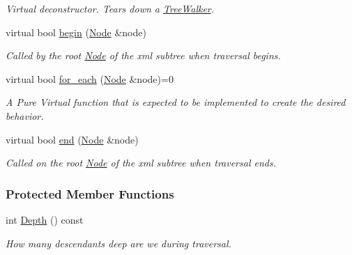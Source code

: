 \begin{DoxyCompactItemize}
\begin{DoxyCompactList}\small\item\em Virtual deconstructor. Tears down a \hyperlink{classphys_1_1xml_1_1TreeWalker}{TreeWalker}. \item\end{DoxyCompactList}\item 
virtual bool \hyperlink{classphys_1_1xml_1_1TreeWalker_a649d9e5a06542be0282d3d20994a62fc}{begin} (\hyperlink{classphys_1_1xml_1_1Node}{Node} \&node)
\begin{DoxyCompactList}\small\item\em Called by the root \hyperlink{classphys_1_1xml_1_1Node}{Node} of the xml subtree when traversal begins. \item\end{DoxyCompactList}\item 
virtual bool \hyperlink{classphys_1_1xml_1_1TreeWalker_a03267e73acac44809f16739fd00a536d}{for\_\-each} (\hyperlink{classphys_1_1xml_1_1Node}{Node} \&node)=0
\begin{DoxyCompactList}\small\item\em A Pure Virtual function that is expected to be implemented to create the desired behavior. \item\end{DoxyCompactList}\item 
virtual bool \hyperlink{classphys_1_1xml_1_1TreeWalker_a210f6d60579a152f89e651be797885b9}{end} (\hyperlink{classphys_1_1xml_1_1Node}{Node} \&node)
\begin{DoxyCompactList}\small\item\em Called on the root \hyperlink{classphys_1_1xml_1_1Node}{Node} of the xml subtree when traversal ends. \item\end{DoxyCompactList}\end{DoxyCompactItemize}
\subsubsection*{Protected Member Functions}
\begin{DoxyCompactItemize}
\item 
int \hyperlink{classphys_1_1xml_1_1TreeWalker_a90fdd705ae4d5e8e3b931bb8896e4397}{Depth} () const 
\begin{DoxyCompactList}\small\item\em How many descendants deep are we during traversal. \item\end{DoxyCompactList}\end{DoxyCompactItemize}
